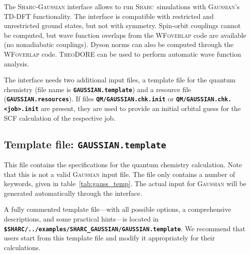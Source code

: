 \documentclass[a4paper,10pt,DIV=15,openany]{scrbook}
\newcommand{\sharc}{\textsc{Sharc}}
\newcommand{\ttt}[1]{\textbf{\texttt{#1}}}
\begin{document}
The \sharc-\textsc{Gaussian} interface allows to run \sharc\ simulations with \textsc{Gaussian}'s TD-DFT functionality.
The interface is compatible with restricted and unrestricted ground states, but not with symmetry.
Spin-orbit couplings cannot be computed, but wave function overlaps from the \textsc{WFoverlap} code are available (no nonadiabatic couplings).
Dyson norms can also be computed through the \textsc{WFoverlap} code.
\textsc{TheoDORE} can be used to perform automatic wave function analysis.

The interface needs two additional input files, a template file for the quantum chemistry (file name is \ttt{GAUSSIAN.template}) and a resource file (\ttt{GAUSSIAN.resources}). 
If files \ttt{QM/GAUSSIAN.chk.init} or \ttt{QM/GAUSSIAN.chk.<job>.init} are present, they are used to provide an initial orbital guess for the SCF calculation of the respective job.

\subsection{Template file: \ttt{GAUSSIAN.template}}

This file contains the specifications for the quantum chemistry calculation. Note that this is not a valid \textsc{Gaussian} input file. The file only contains a number of keywords, given in table~\ref{tab:gauss_temp}. The actual input for \textsc{Gaussian} will be generated automatically through the interface.

A fully commented template file---with all possible options, a comprehensive descriptions, and some practical hints---is located in \ttt{\$SHARC/../examples/SHARC\_GAUSSIAN/GAUSSIAN.template}.
We recommend that users start from this template file and modify it appropriately for their calculations.
\end{document}
